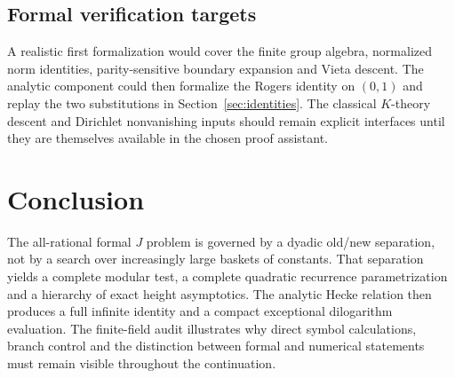 \documentclass[11pt]{article}
\numberwithin{equation}{section}
\theoremstyle{definition}
\theoremstyle{remark}
\begin{document}
\subsection{Formal verification targets}

A realistic first formalization would cover the finite group algebra,
normalized norm identities, parity-sensitive boundary expansion and
Vieta descent. The analytic component could then formalize the Rogers
identity on $(0,1)$ and replay the two substitutions in
Section~\ref{sec:identities}. The classical $K$-theory descent and
Dirichlet nonvanishing inputs should remain explicit interfaces until
they are themselves available in the chosen proof assistant.

\section*{Conclusion}

The all-rational formal $J$ problem is governed by a dyadic old/new
separation, not by a search over increasingly large baskets of constants.
That separation yields a complete modular test, a complete quadratic
recurrence parametrization and a hierarchy of exact height asymptotics.
The analytic Hecke relation then produces a full infinite identity and
a compact exceptional dilogarithm evaluation. The finite-field audit
illustrates why direct symbol calculations, branch control and the
distinction between formal and numerical statements must remain visible
throughout the continuation.

\end{document}
